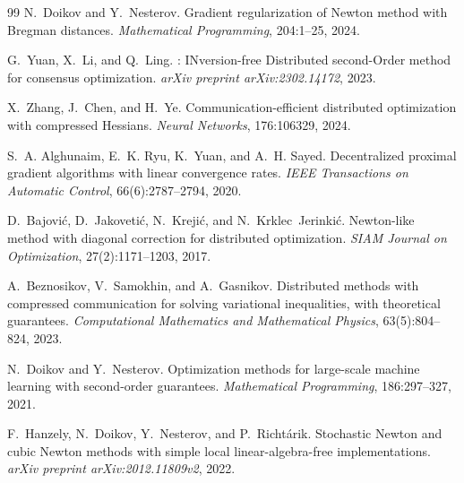 \documentclass[10pt,twocolumn,letterpaper]{article}
\theoremstyle{compact}
\theoremstyle{compactremark}
\begin{document}
{\begin{thebibliography}{99}
		N.~Doikov and Y.~Nesterov.
		\newblock Gradient regularization of {N}ewton method with {B}regman distances.
		\newblock \emph{Mathematical Programming}, 204:1--25, 2024.
		
		G.~Yuan, X.~Li, and Q.~Ling.
		: {IN}version-free {D}istributed second-{O}rder method for consensus optimization.
		\newblock \emph{arXiv preprint arXiv:2302.14172}, 2023.
		
		X.~Zhang, J.~Chen, and H.~Ye.
		\newblock Communication-efficient distributed optimization with compressed {H}essians.
		\newblock \emph{Neural Networks}, 176:106329, 2024.
		
		S.~A. Alghunaim, E.~K. Ryu, K.~Yuan, and A.~H. Sayed.
		\newblock Decentralized proximal gradient algorithms with linear convergence rates.
		\newblock \emph{IEEE Transactions on Automatic Control}, 66(6):2787--2794, 2020.
		
		D.~Bajovi{\'c}, D.~Jakoveti{\'c}, N.~Kre\-ji{\'c}, and N.~Krklec~Jerinki{\'c}.
		\newblock Newton-like method with diagonal correction for distributed optimization.
		\newblock \emph{SIAM Journal on Optimization}, 27(2):1171--1203, 2017.
		
		A.~Beznosikov, V.~Samokhin, and A.~Gasnikov.
		\newblock Distributed methods with compressed communication for solving variational inequalities, with theoretical guarantees.
		\newblock \emph{Computational Mathematics and Mathematical Physics}, 63(5):804--824, 2023.
		
		N.~Doikov and Y.~Nesterov.
		\newblock Optimization methods for large-scale machine learning with second-order guarantees.
		\newblock \emph{Mathematical Programming}, 186:297--327, 2021.
		
		F.~Hanzely, N.~Doikov, Y.~Nesterov, and P.~Richt{\'a}rik.
		\newblock Stochastic Newton and cubic Newton methods with simple local linear-algebra-free implementations.
		\newblock \emph{arXiv preprint arXiv:2012.11809v2}, 2022.
		

\end{thebibliography}}
\end{document}
